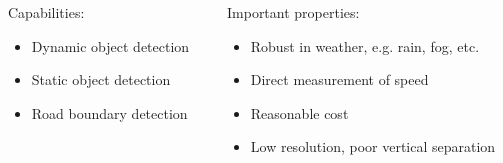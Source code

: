 \begin{frame}
\begin{columns}[T]
    \begin{column}{0.4\textwidth}
        \footnotesize
        Capabilities:
        \begin{itemize}
            \item Dynamic object detection
            \item Static object detection
            \item Road boundary detection
        \end{itemize}
    \end{column}
    \begin{column}{0.6\textwidth}
        \footnotesize
        Important properties:
        \begin{itemize}
            \item Robust in weather, e.g. rain, fog, etc.
            \item Direct measurement of speed
            \item Reasonable cost
            \item Low resolution, poor vertical separation
        \end{itemize}
    \end{column}
\end{columns}
\end{frame}

